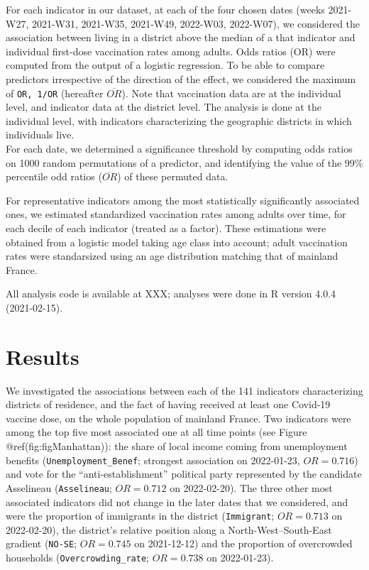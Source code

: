 \documentclass[
]{article}
\begin{document}
For each indicator in our dataset, at each of the four chosen dates
(weeks 2021-W27, 2021-W31, 2021-W35, 2021-W49, 2022-W03, 2022-W07), we
considered the association between living in a district above the median
of a that indicator and individual first-dose vaccination rates among
adults. Odds ratios (OR) were computed from the output of a logistic
regression. To be able to compare predictors irrespective of the
direction of the effect, we considered the maximum of \texttt{OR,\ 1/OR}
(hereafter \(\overline{OR}\)). Note that vaccination data are at the
individual level, and indicator data at the district level. The analysis
is done at the individual level, with indicators characterizing the
geographic districts in which individuals live.\\
For each date, we determined a significance threshold by computing odds
ratios on 1000 random permutations of a predictor, and identifying the
value of the 99\% percentile odd ratios (\(\overline{OR}\)) of these
permuted data.

For representative indicators among the most statistically significantly
associated ones, we estimated standardized vaccination rates among
adults over time, for each decile of each indicator (treated as a
factor). These estimations were obtained from a logistic model taking
age class into account; adult vaccination rates were standarsized using
an age distribution matching that of mainland France.

All analysis code is available at XXX; analyses were done in R version
4.0.4 (2021-02-15).

\hypertarget{results}{%
\section{Results}\label{results}}

We investigated the associations between each of the 141 indicators
characterizing districts of residence, and the fact of having received
at least one Covid-19 vaccine dose, on the whole population of mainland
France. Two indicators were among the top five most associated one at
all time points (see Figure @ref(fig:figManhattan)): the share of local
income coming from unemployment benefits (\texttt{Unemployment\_Benef};
strongest association on 2022-01-23, \(OR = 0.716\)) and vote for the
``anti-establishment'' political party represented by the candidate
Asselineau (\texttt{Asselineau}; \(OR = 0.712\) on 2022-02-20). The
three other most associated indicators did not change in the later dates
that we considered, and were the proportion of immigrants in the
district (\texttt{Immigrant}; \(OR = 0.713\) on 2022-02-20), the
district's relative position along a North-West--South-East gradient
(\texttt{NO-SE}; \(OR = 0.745\) on 2021-12-12) and the proportion of
overcrowded households (\texttt{Overcrowding\_rate}; \(OR = 0.738\) on
2022-01-23).
\end{document}

